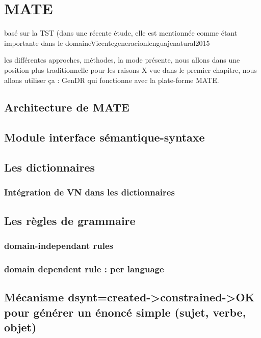 
\chapter{MATE}

basé sur la TST (dans une récente étude, elle est mentionnée comme étant importante dans le domaine{Vicentegeneracionlenguajenatural2015}

les différentes approches, méthodes, la mode présente, nous allons dans une position plus traditionnelle pour les raisons  X vue dans le premier chapitre, nous allons utiliser ça : GenDR qui fonctionne avec la plate-forme MATE.

\section{Architecture de MATE}

\section{Module interface sémantique-syntaxe}

\section{Les dictionnaires}
\subsection{Intégration de VN dans les dictionnaires}

\section{Les règles de grammaire}
\subsection{domain-independant rules}
\subsection{domain dependent rule : per language}



\section{Mécanisme dsynt=created->constrained->OK pour générer un énoncé simple (sujet, verbe, objet)}

